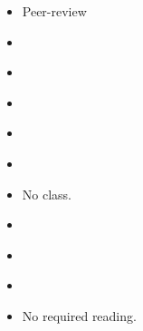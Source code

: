 \documentclass{article}
\begin{document}
\dia{}
\begin{itemize}
\item Peer-review
\end{itemize}

\dia{}
\begin{itemize}
\item {}
\end{itemize}

\dia{}
\begin{itemize}
\item {}
\end{itemize}

\dia{}
\begin{itemize}
\item {}
\end{itemize}

\dia{}
\begin{itemize}
\item {}
\end{itemize}


\dia{}
\begin{itemize}
\item {}
\end{itemize}

\dia{}
\begin{itemize}
\item No class. %
\end{itemize}

\week{}
\dia{}\SpringBreak{}
\dia{}\SpringBreak{}

\dia{}
\begin{itemize}
\item {}
\end{itemize}

\dia{}
\begin{itemize}
\item {}
\end{itemize}


\dia{}
\begin{itemize}
\item {}
\end{itemize}

\dia{}
\begin{itemize}
\item No required reading.
\end{itemize}


\begin{comment}
PGS' chapter on social evolution; Calcott's paper on generating benefit.
  
\end{comment}
\end{document}
